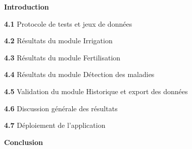 \documentclass[12pt,a4paper]{report}
\begin{document}
	\vspace{3pt}
	\begin{list}{}{%
			\setlength{\leftmargin}{0pt}
			\setlength{\itemsep}{2pt}
		}
		\item \textbf{Introduction} \dotfill
		
		\vspace{4pt}
		\item \textbf{4.1} \quad Protocole de tests et jeux de donn\'ees \dotfill
		
		\vspace{4pt}
		\item \textbf{4.2} \quad R\'esultats du module Irrigation \dotfill
		
		\vspace{4pt}
		\item \textbf{4.3} \quad R\'esultats du module Fertilisation \dotfill
		
		\vspace{4pt}
		\item \textbf{4.4} \quad R\'esultats du module D\'etection des maladies \dotfill
		
		\vspace{4pt}
		\item \textbf{4.5} \quad Validation du module Historique et export des donn\'ees \dotfill
		
		\vspace{4pt}
		\item \textbf{4.6} \quad Discussion g\'en\'erale des r\'esultats \dotfill
		
		\vspace{4pt}
		\item \textbf{4.7} \quad D\'eploiement de l'application \dotfill
		
		\vspace{4pt}
		\item \textbf{Conclusion} \dotfill
	\end{list}
	
	\vspace{0.8cm}
	
	
	\noindent
	\colorbox{bleuPrincipal}{%
		\parbox{\linewidth}{%
			\vspace{3pt}
			\hfill{\color{white}\bfseries }
			\vspace{3pt}
		}%
	}
	
\end{document}
